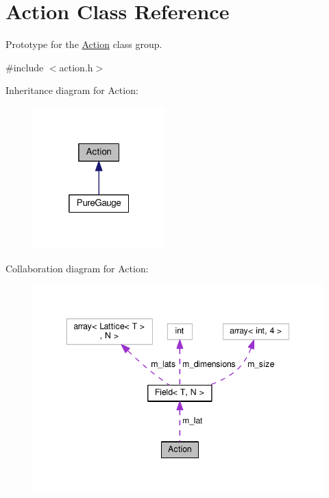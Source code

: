 \hypertarget{classAction}{}\section{Action Class Reference}
\label{classAction}


Prototype for the \hyperlink{classAction}{Action} class group.  




{\ttfamily \#include $<$action.\+h$>$}



Inheritance diagram for Action\+:\nopagebreak
\begin{figure}[H]
\begin{center}
\leavevmode
\includegraphics[width=145pt]{d7/d94/classAction__inherit__graph}
\end{center}
\end{figure}


Collaboration diagram for Action\+:\nopagebreak
\begin{figure}[H]
\begin{center}
\leavevmode
\includegraphics[width=343pt]{d7/dfc/classAction__coll__graph}
\end{center}
\end{figure}
